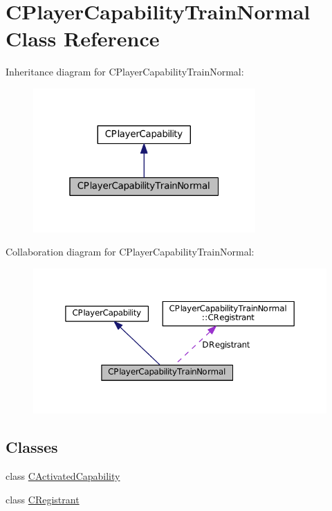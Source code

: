 \hypertarget{classCPlayerCapabilityTrainNormal}{}\section{C\+Player\+Capability\+Train\+Normal Class Reference}
\label{classCPlayerCapabilityTrainNormal}


Inheritance diagram for C\+Player\+Capability\+Train\+Normal\+:\nopagebreak
\begin{figure}[H]
\begin{center}
\leavevmode
\includegraphics[width=241pt]{classCPlayerCapabilityTrainNormal__inherit__graph}
\end{center}
\end{figure}


Collaboration diagram for C\+Player\+Capability\+Train\+Normal\+:\nopagebreak
\begin{figure}[H]
\begin{center}
\leavevmode
\includegraphics[width=350pt]{classCPlayerCapabilityTrainNormal__coll__graph}
\end{center}
\end{figure}
\subsection*{Classes}
\begin{DoxyCompactItemize}
\item 
class \hyperlink{classCPlayerCapabilityTrainNormal_1_1CActivatedCapability}{C\+Activated\+Capability}
\item 
class \hyperlink{classCPlayerCapabilityTrainNormal_1_1CRegistrant}{C\+Registrant}
\end{DoxyCompactItemize}
